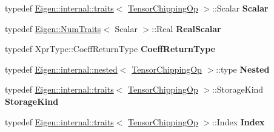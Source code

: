 \begin{DoxyCompactItemize}
typedef \hyperlink{struct_eigen_1_1internal_1_1traits}{Eigen\+::internal\+::traits}$<$ \hyperlink{class_eigen_1_1_tensor_chipping_op}{Tensor\+Chipping\+Op} $>$\+::Scalar {\bfseries Scalar}
\item 
\mbox{\label{class_eigen_1_1_tensor_chipping_op_a9db513cf5c37618638d35aaf053baeda}} 
typedef \hyperlink{group___core___module_struct_eigen_1_1_num_traits}{Eigen\+::\+Num\+Traits}$<$ Scalar $>$\+::Real {\bfseries Real\+Scalar}
\item 
\mbox{\label{class_eigen_1_1_tensor_chipping_op_af6bcebbf33152e4e7b38546156969e0c}} 
typedef Xpr\+Type\+::\+Coeff\+Return\+Type {\bfseries Coeff\+Return\+Type}
\item 
\mbox{\label{class_eigen_1_1_tensor_chipping_op_a266ace2a06b1780e5dc356e39440aca0}} 
typedef \hyperlink{struct_eigen_1_1internal_1_1nested}{Eigen\+::internal\+::nested}$<$ \hyperlink{class_eigen_1_1_tensor_chipping_op}{Tensor\+Chipping\+Op} $>$\+::type {\bfseries Nested}
\item 
\mbox{\label{class_eigen_1_1_tensor_chipping_op_a1db78b64454b7be7abc167005af51a8a}} 
typedef \hyperlink{struct_eigen_1_1internal_1_1traits}{Eigen\+::internal\+::traits}$<$ \hyperlink{class_eigen_1_1_tensor_chipping_op}{Tensor\+Chipping\+Op} $>$\+::Storage\+Kind {\bfseries Storage\+Kind}
\item 
\mbox{\label{class_eigen_1_1_tensor_chipping_op_a0e7f21e2ee6dda5f33624309faaaf0a0}} 
typedef \hyperlink{struct_eigen_1_1internal_1_1traits}{Eigen\+::internal\+::traits}$<$ \hyperlink{class_eigen_1_1_tensor_chipping_op}{Tensor\+Chipping\+Op} $>$\+::Index {\bfseries Index}
\end{DoxyCompactItemize}
